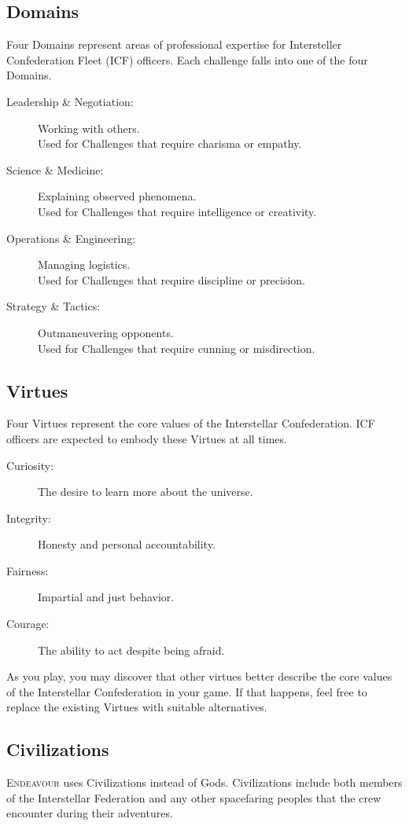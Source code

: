 \documentclass[11pt, a5paper, parskip=half-, DIV=12]{scrartcl}
\newcommand{\ENDEAVOUR}{\textsc{Endeavour}}%
\begin{document}
\newpage

\subsection*{Domains}
Four Domains represent areas of professional expertise for Intersteller Confederation Fleet (ICF) officers. Each challenge falls into one of the four Domains.
\begin{description}
	\item[Leadership \& Negotiation:] Working with others.\\Used for Challenges that require charisma or empathy.
	\item[Science \& Medicine:] Explaining observed phenomena.\\Used for Challenges that require intelligence or creativity.
	\item[Operations \& Engineering:] Managing logistics.\\Used for Challenges that require discipline or precision.
	\item[Strategy \& Tactics:] Outmaneuvering opponents.\\Used for Challenges that require cunning or misdirection.
\end{description}

\subsection*{Virtues}
Four Virtues represent the core values of the Interstellar Confederation. ICF officers are expected to embody these Virtues at all times.
\begin{description}
	\item[Curiosity:] The desire to learn more about the universe.
	\item[Integrity:] Honesty and personal accountability.
	\item[Fairness:] Impartial and just behavior.
	\item[Courage:] The ability to act despite being afraid.
\end{description}
As you play, you may discover that other virtues better describe the core values of the Interstellar Confederation in your game.  If that happens, feel free to replace the existing Virtues with suitable alternatives.

\newpage

\subsection*{Civilizations}
\ENDEAVOUR{} uses Civilizations instead of Gods.  Civilizations include both members of the Interstellar Federation and any other spacefaring peoples that the crew encounter during their adventures.
\end{document}
